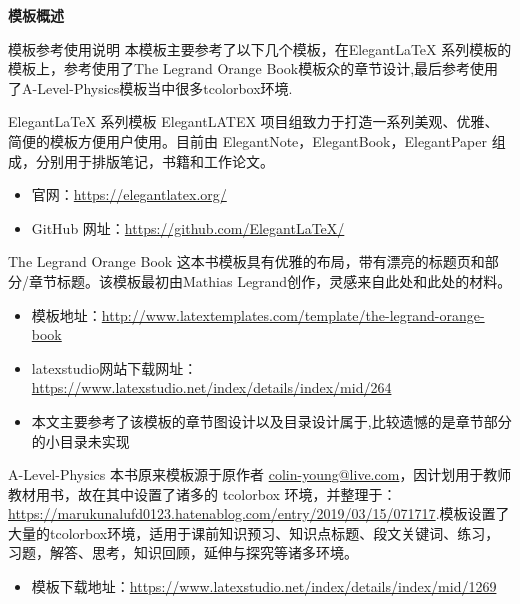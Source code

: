 
\frontmatter
\thispagestyle{empty}
\newpage
\begin{center}
	\textbf{\LARGE 模板概述}
\end{center}
\begin{ascolorbox5}{模板参考使用说明}
本模板主要参考了以下几个模板，在Elegant\LaTeX{} 系列模板的模板上，参考使用了The Legrand Orange Book模板众的章节设计,最后参考使用了A-Level-Physics模板当中很多tcolorbox环境.
\begin{ascboxB}{Elegant\LaTeX{} 系列模板}
ElegantLATEX 项目组致力于打造一系列美观、优雅、简便的模板方便用户使用。目前由
ElegantNote，ElegantBook，ElegantPaper 组成，分别用于排版笔记，书籍和工作论文。
\begin{itemize}
	\item 官网：\href{https://elegantlatex.org/}{https://elegantlatex.org/}
	\item GitHub 网址：\href{https://github.com/ElegantLaTeX/}{https://github.com/ElegantLaTeX/}
\end{itemize} 
\end{ascboxB}
\begin{ascboxB}{The Legrand Orange Book}
这本书模板具有优雅的布局，带有漂亮的标题页和部分/章节标题。该模板最初由Mathias Legrand创作，灵感来自此处和此处的材料。
\begin{itemize}
\item  模板地址：\href{http://www.latextemplates.com/template/the-legrand-orange-book}{http://www.latextemplates.com/template/the-legrand-orange-book}
\item  latexstudio网站下载网址：\href{https://www.latexstudio.net/index/details/index/mid/264}{https://www.latexstudio.net/index/details/index/mid/264}
\item 本文主要参考了该模板的章节图设计以及目录设计属于,比较遗憾的是章节部分的小目录未实现
\end{itemize} 
\end{ascboxB}
\begin{ascboxB}{A-Level-Physics}
本书原来模板源于原作者  \url{colin-young@live.com}，因计划用于教师教材用书，故在其中设置了诸多的 tcolorbox 环境，并整理于：\url{https://marukunalufd0123.hatenablog.com/entry/2019/03/15/071717}.模板设置了大量的tcolorbox环境，适用于课前知识预习、知识点标题、段文关键词、练习，习题，解答、思考，知识回顾，延伸与探究等诸多环境。
\begin{itemize}
	\item 模板下载地址：\href{https://www.latexstudio.net/index/details/index/mid/1269}{https://www.latexstudio.net/index/details/index/mid/1269}

\end{itemize}
\end{ascboxB}
\end{ascolorbox5}
